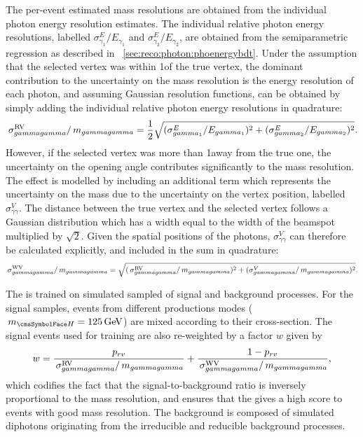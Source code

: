 The per-event estimated mass resolutions are obtained from the individual photon energy resolution estimates. The individual relative photon energy resolutions, labelled $\sigma^E_{\gamma_1}/E_{\gamma_1}$ and $\sigma^E_{\gamma_2}/E_{\gamma_2}$, are obtained from the semiparametric regression \PhoEnergyBdt as described in \Sec~\ref{sec:reco:photon:phoenergybdt}. Under the assumption that the selected vertex was within 1\cm of the true vertex, the dominant contribution to the uncertainty on the mass resolution is the energy resolution of each photon, and assuming Gaussian resolution functions, \sigmarv can be obtained by simply adding the individual relative photon energy resolutions in quadrature:
\begin{equation}
\,\sigma^\text{RV}_{gammagamma}/\,m_{gammagamma}= \frac{1}{2} \sqrt{({\sigma^E_{gamma_1}}/{E_{gamma_1}})^2 +({\sigma^E_{gamma_2}}/{E_{gamma_2}})^2 }.
\end{equation} 
However, if the selected vertex was more than 1\cm away from the true one, the uncertainty on the opening angle contributes significantly to the mass resolution. The effect is modelled by including an additional term which represents the uncertainty on the mass due to the uncertainty on the vertex position, labelled $\sigma^V_{\gamma\gamma}$. The distance between the true vertex and the selected vertex follows a Gaussian distribution which has a width equal to the width of the beamspot multiplied by $\sqrt{2}$. Given the spatial positions of the photons, $\sigma^V_{\gamma\gamma}$ can therefore be calculated explicitly, and included in the sum in quadrature:
\begin{equation}
\,\sigma^\text{WV}_{gammagamma}/\,m_{gammagamma}=  \sqrt{(\,\sigma^\text{RV}_{gammagamma}/\,m_{gammagamma})^2 +(\sigma^V_{gammagamma}/\,m_{gammagamma})^2 }.
\end{equation} 

The \DiPhoBdt is trained on simulated sampled of signal and background processes. For the signal samples, events from different productions modes ($\mH=125\GeV$) are mixed according to their cross-section. The signal events used for training are also re-weighted by a factor $w$  given by 
\begin{equation}
w=  \frac{p_{rv}}{\,\sigma^\text{RV}_{gammagamma}/\,m_{gammagamma}}+\frac{1-p_{rv}}{\,\sigma^\text{WV}_{gammagamma}/\,m_{gammagamma}},
\end{equation} 
which codifies the fact that the signal-to-background ratio is inversely proportional to the mass resolution, and ensures that the \DiPhoBdt gives a high score to events with good mass resolution.
The background is composed of simulated diphotons originating from the irreducible and reducible \SM background processes. 

